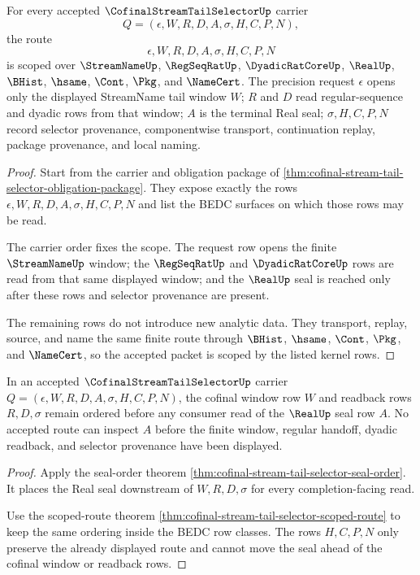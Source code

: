 \begin{theorem}
\label{thm:cofinal-stream-tail-selector-scoped-route}
For every accepted $\CofinalStreamTailSelectorUp$ carrier
$$
Q=(\epsilon,W,R,D,A,\sigma,H,C,P,N),
$$
the route
$$
\epsilon,W,R,D,A,\sigma,H,C,P,N
$$
is scoped over $\StreamNameUp$, $\RegSeqRatUp$, $\DyadicRatCoreUp$, $\RealUp$, $\BHist$, $\hsame$, $\Cont$, $\Pkg$, and $\NameCert$. The precision request $\epsilon$ opens only the displayed StreamName tail window $W$; $R$ and $D$ read regular-sequence and dyadic rows from that window; $A$ is the terminal Real seal; $\sigma,H,C,P,N$ record selector provenance, componentwise transport, continuation replay, package provenance, and local naming.
\end{theorem}
\begin{proof}
Start from the carrier and obligation package of \autoref{thm:cofinal-stream-tail-selector-obligation-package}. They expose exactly the rows $\epsilon,W,R,D,A,\sigma,H,C,P,N$ and list the BEDC surfaces on which those rows may be read.

The carrier order fixes the scope. The request row opens the finite $\StreamNameUp$ window; the $\RegSeqRatUp$ and $\DyadicRatCoreUp$ rows are read from that same displayed window; and the $\RealUp$ seal is reached only after these rows and selector provenance are present.

The remaining rows do not introduce new analytic data. They transport, replay, source, and name the same finite route through $\BHist$, $\hsame$, $\Cont$, $\Pkg$, and $\NameCert$, so the accepted packet is scoped by the listed kernel rows.
\end{proof}

\begin{theorem}
\label{thm:cofinal-stream-tail-selector-window-readback-scope}
In an accepted $\CofinalStreamTailSelectorUp$ carrier $Q=(\epsilon,W,R,D,A,\sigma,H,C,P,N)$, the cofinal window row $W$ and readback rows $R,D,\sigma$ remain ordered before any consumer read of the $\RealUp$ seal row $A$. No accepted route can inspect $A$ before the finite window, regular handoff, dyadic readback, and selector provenance have been displayed.
\end{theorem}
\begin{proof}
Apply the seal-order theorem \autoref{thm:cofinal-stream-tail-selector-seal-order}. It places the Real seal downstream of $W,R,D,\sigma$ for every completion-facing read.

Use the scoped-route theorem \autoref{thm:cofinal-stream-tail-selector-scoped-route} to keep the same ordering inside the BEDC row classes. The rows $H,C,P,N$ only preserve the already displayed route and cannot move the seal ahead of the cofinal window or readback rows.
\end{proof}

